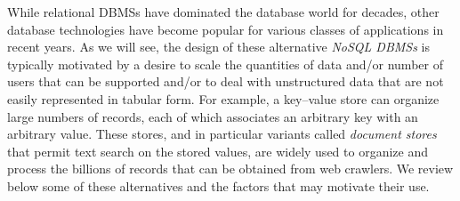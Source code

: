 \documentclass[]{krantz}
\begin{document}
While relational DBMSs have dominated the database world for decades,
other database technologies have become popular for various classes of
applications in recent years. As we will see, the design of these
alternative \emph{NoSQL DBMSs} is typically motivated by a desire to
scale the quantities of data and/or number of users that can be
supported and/or to deal with unstructured data that are not easily
represented in tabular form. For example, a key--value store can
organize large numbers of records, each of which associates an arbitrary
key with an arbitrary value. These stores, and in particular variants
called \emph{document stores} that permit text search on the stored
values, are widely used to organize and process the billions of records
that can be obtained from web crawlers. We review below some of these
alternatives and the factors that may motivate their use.
\end{document}
